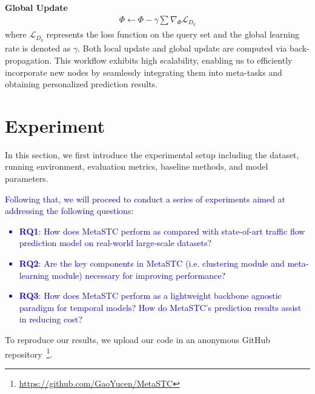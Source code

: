 \documentclass[lettersize,journal]{IEEEtran}
\begin{document}
\color{black}

\textbf{Global Update}
\begin{gather}
\Phi \xleftarrow{} \Phi - \gamma \sum \nabla_{\Phi} \mathcal{L}_{D_q}
\end{gather}
where $\mathcal{L}_{D_q}$ represents the loss function on the query set and the global learning rate is denoted as $\gamma$. Both local update and global update are computed via back-propagation. This workflow exhibits high scalability, enabling us to efficiently incorporate new nodes by seamlessly integrating them into meta-tasks and obtaining personalized prediction results.

\section{Experiment}
\label{sec:exp}
In this section, we first introduce the experimental setup including the dataset, running environment, evaluation metrics, baseline methods, and model parameters. \textcolor{blue}{Following that, we will proceed to conduct a series of experiments aimed at addressing the following questions:
\begin{itemize}
\item \textbf{RQ1}: How does MetaSTC perform as compared with state-of-art traffic flow prediction model on real-world large-scale datasets?
\item \textbf{RQ2}: Are the key components in MetaSTC (i.e. clustering module and meta-learning module) necessary for improving performance?
\item \textbf{RQ3}: How does MetaSTC perform as a lightweight backbone agnostic paradigm for temporal models? How do MetaSTC's prediction results assist in reducing cost?
\end{itemize}}

To reproduce our results, we upload our code in an anonymous GitHub repository~\footnote{\url{https://github.com/GaoYucen/MetaSTC}}.
\end{document}
